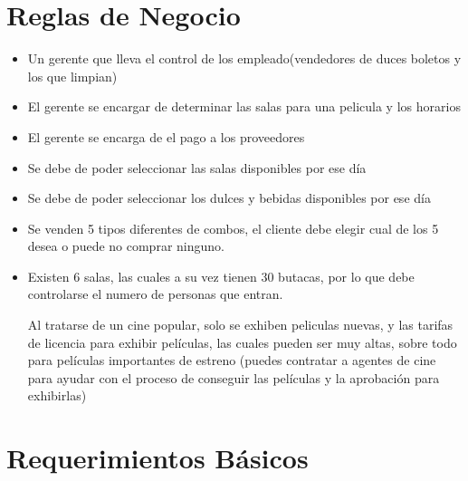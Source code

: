 \documentclass[12pt, fleqn]{article}                             %
\begin{document}
\clearpage

\section{Reglas de Negocio}

    \begin{itemize}
        \item Un gerente que lleva el control de los empleado(vendedores de duces boletos y los que limpian)

        \item El gerente se encargar de determinar las salas para una pelicula y los horarios

        \item El gerente se encarga de el pago a los proveedores

        \item Se debe de poder seleccionar las salas disponibles por ese día

        \item Se debe de poder seleccionar los dulces y bebidas disponibles por ese día

        \item Se venden 5 tipos diferentes de combos, el cliente debe elegir cual de los
            5 desea o puede no comprar ninguno.

        \item Existen 6 salas, las cuales a su vez tienen 30 butacas, por lo que debe controlarse el numero
            de personas que entran.

            Al tratarse de un cine popular, solo se exhiben peliculas nuevas, y las tarifas de licencia
            para exhibir películas, las cuales pueden ser muy altas, sobre todo para películas importantes
            de estreno (puedes contratar a agentes de cine para ayudar con el proceso de conseguir las
            películas y la aprobación para exhibirlas)

    \end{itemize}



\clearpage
\section{Requerimientos Básicos}
\end{document}

